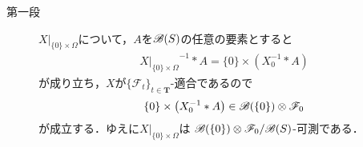 	\begin{sketch}\mbox{}
		\begin{description}
			\item[第一段] $X|_{\{0\} \times \Omega}$について，$A$を$\mathscr{B}(S)$の任意の要素とすると
				\begin{align}
					{X|_{\{0\} \times \Omega}}^{-1} \ast A
					= \{0\} \times \left( X_0^{-1} \ast A \right)
				\end{align}
				が成り立ち，$X$が$\{\mathscr{F}_t\}_{t \in \mathbf{T}}$-適合であるので
				\begin{align}
					\{0\} \times \left( X_0^{-1} \ast A \right) \in \mathscr{B}(\{0\}) \otimes \mathscr{F}_0
				\end{align}
				が成立する．ゆえに$X|_{\{0\} \times \Omega}$は
				$\mathscr{B}(\{0\}) \otimes \mathscr{F}_0/\mathscr{B}(S)$-可測である．
				

\end{description}
\end{sketch}
